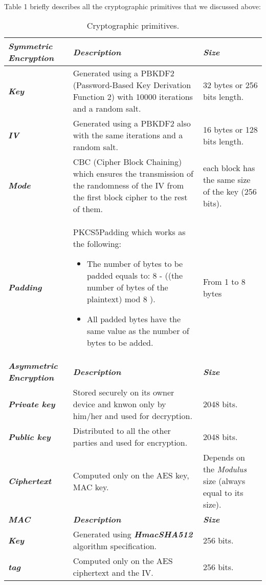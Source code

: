	\paragraph{}
	Table 1 briefly describes all the cryptographic primitives that we discussed above:
	\newpage
	\begin{table}[H]
	 \centering
	  \begin{tabular}{| p{5.2cm} | p{5cm} | p{5cm} |}
	  \hline
	    \textbf{\textit{Symmetric Encryption}}  & \textbf{\textit{Description}}  & \textbf{\textit{Size}} \\ \hline
	    \textbf{\textit{Key}}  & Generated using a PBKDF2 (Password-Based Key Derivation Function 2) with 10000 iterations and a random salt. & 32 bytes or 256 bits length. \\ \hline
	    \textbf{\textit{IV}}  & Generated using a PBKDF2 also with the same iterations and a random salt. & 16 bytes or 128 bits length. \\ \hline
	    \textbf{\textit{Mode}}  & CBC (Cipher Block Chaining) which ensures the transmission of the randomness of the IV from the first block cipher to the rest of them. & each block has the same size of the key (256 bits). \\ \hline
	    \textbf{\textit{Padding}} & PKCS5Padding which works as the following:
		      \begin{itemize}
			\item The number of bytes to be padded equals to: 8 - ((the number of bytes of the plaintext) mod 8 ).
			\item All padded bytes have the same value as the number of bytes to be added.
		      \end{itemize} 
		      & From 1 to 8 bytes \\
		      \hline
	    \textbf{\textit{Asymmetric Encryption}} & \textbf{\textit{Description}} & \textbf{\textit{Size}} \\ \hline
	    \textbf{\textit{Private key}} & Stored securely on its owner device and knwon only by him/her and used for decryption. & 2048 bits. \\ \hline
	    \textbf{\textit{Public key}} & Distributed to all the other parties and used for encryption. & 2048 bits. \\ \hline
	    \textbf{\textit{Ciphertext}} & Computed only on the AES key, MAC key. & Depends on the \textit{Modulus} size (always equal to its size). \\ \hline
	    \textbf{\textit{MAC}} & \textbf{\textit{Description}} & \textbf{\textit{Size}} \\ \hline
	    \textbf{\textit{Key}} & Generated using \textbf{\textit{HmacSHA512}} algorithm specification. & 256 bits. \\ \hline
	    \textbf{\textit{tag}} & Computed only on the AES ciphertext and the IV. & 256 bits. \\ \hline

	\end{tabular}
	
	\caption{Cryptographic primitives.}
	\label{Table 1}
	
	\end{table}
	\newpage


	

